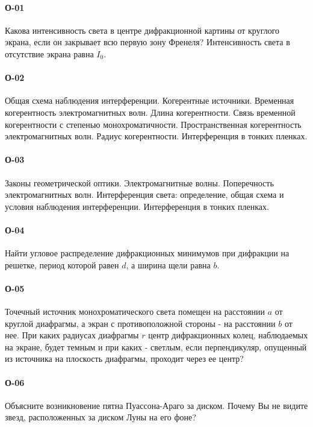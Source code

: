 



\paragraph{О-01}
Какова интенсивность света в центре дифракционной картины от круглого экрана, если он закрывает всю первую зону Френеля? Интенсивность света в отсутствие экрана равна $I_0$.

\paragraph{О-02}
Общая схема наблюдения интерференции. Когерентные источники. Временная когерентность электромагнитных волн. Длина когерентности. Связь временной когерентности с степенью монохроматичности. Пространственная когерентность электромагнитных волн. Радиус когерентности. Интерференция в тонких пленках.

\paragraph{О-03}
Законы геометрической оптики. Электромагнитные волны. Поперечность электромагнитных волн. Интерференция света: определение, общая схема и условия наблюдения интерференции. Интерференция в тонких пленках.

\paragraph{О-04}
Найти угловое распределение дифракционных минимумов при дифракции на решетке, период которой равен $d$, а ширина щели равна $b$.

\paragraph{О-05}
Точечный источник монохроматического света помещен на расстоянии $a$ от круглой диафрагмы, а экран с противоположной стороны - на расстоянии $b$ от нее. При каких радиусах диафрагмы $r$ центр дифракционных колец, наблюдаемых на экране, будет темным и при каких - светлым, если перпендикуляр, опущенный из источника на плоскость диафрагмы, проходит через ее центр?

\paragraph{О-06}
Объясните возникновение пятна Пуассона-Араго за диском. Почему Вы не видите звезд, расположенных за диском Луны на его фоне?

